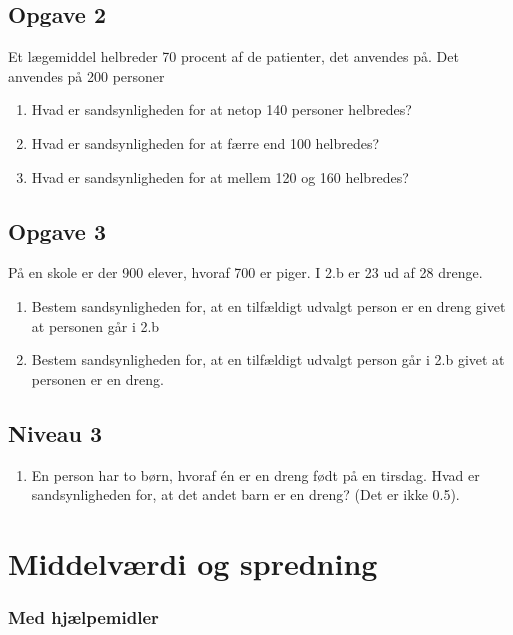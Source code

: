 \subsection*{Opgave 2}

Et lægemiddel helbreder 70 procent af de patienter, det anvendes på. Det anvendes på 200 personer
\begin{enumerate}[label=\roman*)]
	\item Hvad er sandsynligheden for at netop 140 personer helbredes?
	\item Hvad er sandsynligheden for at færre end 100 helbredes?
	\item Hvad er sandsynligheden for at mellem 120 og 160 helbredes?
\end{enumerate}

\subsection*{Opgave 3}
På en skole er der 900 elever, hvoraf 700 er piger. I 2.b er 23 ud af 28 drenge.
\begin{enumerate}[label=\roman*)]
	\item Bestem sandsynligheden for, at en tilfældigt udvalgt person er en dreng givet at personen går i 2.b
	\item Bestem sandsynligheden for, at en tilfældigt udvalgt person går i 2.b givet at personen er en dreng. 
\end{enumerate}

\subsection*{Niveau 3}

\begin{enumerate}[label=\roman*)]
	\item En person har to børn, hvoraf én er en dreng født på en tirsdag. Hvad er sandsynligheden for, at det andet barn er en dreng? (Det er ikke 0.5).
\end{enumerate}


\newpage

\section*{Middelværdi og spredning}

\subsubsection*{Med hjælpemidler}
